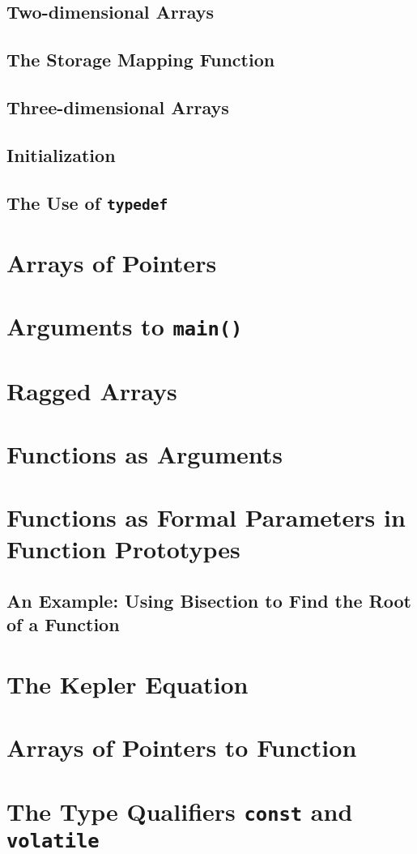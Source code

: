 \documentclass{article}
\begin{document}
\subsection{Two-dimensional Arrays}
\subsection{The Storage Mapping Function}
\subsection{Three-dimensional Arrays}
\subsection{Initialization}
\subsection{The Use of \texttt{typedef}}
\section{Arrays of Pointers}
\section{Arguments to \texttt{main()}}
\section{Ragged Arrays}
\section{Functions as Arguments}
\section{Functions as Formal Parameters in Function Prototypes}
\subsection{An Example: Using Bisection to Find the Root of a Function}
\section{The Kepler Equation}
\section{Arrays of Pointers to Function}
\section{The Type Qualifiers \texttt{const} and \texttt{volatile}}
\end{document}
